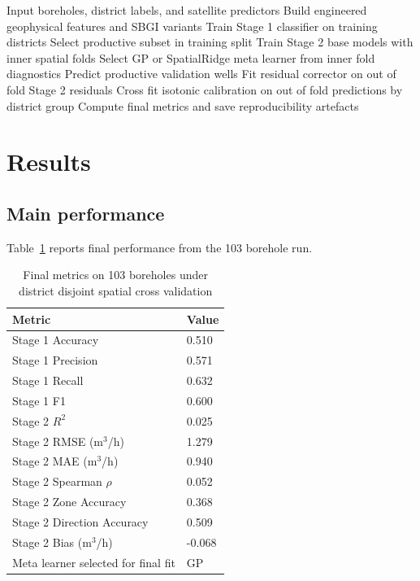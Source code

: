 \documentclass[preprint,12pt]{elsarticle}
\begin{document}
\begin{algorithm}[t]
\caption{Leakage-safe two-stage spatial workflow}
\begin{algorithmic}[1]
\State Input boreholes, district labels, and satellite predictors
\State Build engineered geophysical features and SBGI variants
  \State Train Stage 1 classifier on training districts
  \State Select productive subset in training split
  \State Train Stage 2 base models with inner spatial folds
  \State Select GP or SpatialRidge meta learner from inner fold diagnostics
  \State Predict productive validation wells
\EndFor
\State Fit residual corrector on out of fold Stage 2 residuals
\State Cross fit isotonic calibration on out of fold predictions by district group
\State Compute final metrics and save reproducibility artefacts
\end{algorithmic}
\end{algorithm}

\section{Results}
\subsection{Main performance}
Table~\ref{tab:mainmetrics} reports final performance from the 103 borehole run.

\begin{table}[h]
\centering
\caption{Final metrics on 103 boreholes under district disjoint spatial cross validation}
\label{tab:mainmetrics}
\begin{tabular}{ll}
\toprule
Metric & Value \\
\midrule
Stage 1 Accuracy & 0.510 \\
Stage 1 Precision & 0.571 \\
Stage 1 Recall & 0.632 \\
Stage 1 F1 & 0.600 \\
Stage 2 $R^2$ & 0.025 \\
Stage 2 RMSE (m$^3$/h) & 1.279 \\
Stage 2 MAE (m$^3$/h) & 0.940 \\
Stage 2 Spearman $\rho$ & 0.052 \\
Stage 2 Zone Accuracy & 0.368 \\
Stage 2 Direction Accuracy & 0.509 \\
Stage 2 Bias (m$^3$/h) & -0.068 \\
Meta learner selected for final fit & GP \\
\bottomrule
\end{tabular}
\end{table}
\end{document}
